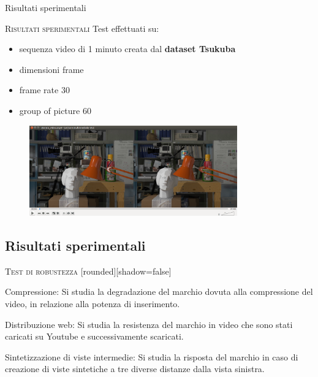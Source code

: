 \documentclass{beamer}
\begin{document}
\begin{section}{Risultati sperimentali}

\begin{frame}[t]{\textsc{Risultati sperimentali}}
Test effettuati su:
\begin{itemize}
\item sequenza video di 1 minuto creata dal \textbf{dataset Tsukuba}
\item dimensioni frame
\item frame rate 30
\item group of picture 60
\end{itemize}

\vspace{2mm}
\begin{figure}
  \includegraphics[width=0.8\textwidth]{./img_wat/video_stereo.png}  
  \label{fig:video}
\end{figure}
\end{frame}

\subsection{Risultati sperimentali}

\begin{frame}[t]{\textsc{Test di robustezza}}
[rounded][shadow=false]
\begin{block}{Compressione:}
Si studia la degradazione del marchio dovuta alla compressione del video, in relazione alla potenza di inserimento.
\end{block}
\begin{block}{Distribuzione web:}
Si studia la resistenza del marchio in video che sono stati caricati su Youtube e successivamente scaricati.
\end{block}
\begin{block}{Sintetizzazione di viste intermedie:}
Si studia la risposta del marchio in caso di creazione di viste sintetiche a tre diverse distanze dalla vista sinistra.
\end{block}


\end{frame}
\end{section}
\end{document}
